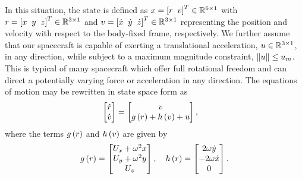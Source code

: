 In this situation, the state is defined as \( x = \left[ r~\>v \right]^T \in \mathbb{R}^{6 \times 1}\) with \(r = \left[ x~\>y~\>z \right]^T \in \mathbb{R}^{3\times1}\) and \(v= \left[  \dot{x}~\>\dot{y}~\>\dot{z}  \right]^T \in \mathbb{R}^{3\times1}\) representing the position and velocity with respect to the body-fixed frame, respectively.
We further assume that our spacecraft is capable of exerting a translational acceleration, \( u \in \mathbb{R}^{3\times1} \), in any direction, while subject to a maximum magnitude constraint, \( \left\| u \right\| \leq u_m \).
This is typical of many spacecraft which offer full rotational freedom and can direct a potentially varying force or acceleration in any direction.
The equations of motion may be rewritten in state space form as
\begin{align}\label{eq:state_space_eoms}
    \begin{bmatrix} \dot{r} \\ \dot{v} \end{bmatrix} &=
    \begin{bmatrix}v \\ g \left( r \right) + h\left( v \right) + u \end{bmatrix} ,
\end{align}
where the terms \(g \left( r \right) \) and \( h\left( v \right) \) are given by
\begin{align}\label{eq:state_space_terms}
    g\left( r \right) = \begin{bmatrix}  U_x + \omega^2 x \\ U_y + \omega^2 y \\ U_z \end{bmatrix} ,\quad
    h\left( r \right) = \begin{bmatrix} 2 \omega \dot{y} \\ -2 \omega \dot{x} \\ 0 \end{bmatrix} .
\end{align}

